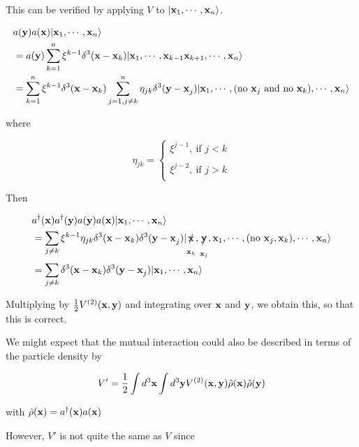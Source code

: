 This can be verified by applying $V$ to $|{\bf x}_1,\cdots,{\bf x}_n\rangle$. 

\[\begin{split}
&a({\bf y})a({\bf x})|{\bf x}_1,\cdots,{\bf x}_n\rangle\\
&=a({\bf y})\sum_{k=1}^n\xi^{k-1}\delta^3({\bf x - x}_k)|{\bf x}_1,\cdots,{\bf x}_{k-1}{\bf x}_{k+1},\cdots,{\bf x}_n\rangle\\
&=\sum_{k=1}^n\xi^{k-1}\delta^3({\bf x-x}_k)\sum_{j=1,j\neq k}^n\eta_{jk}\delta^3({\bf y-x}_j)|{\bf x}_1,\cdots,(\text{no }{\bf x}_j\text{ and no }{\bf x}_k),\cdots,{\bf x}_n\rangle
\end{split}\]

where

\[\eta_{jk}=\begin{cases}
\xi^{j-1},\ \text{if }j<k\\
\ \\
\xi^{j-2},\ \text{if }j>k\\
\end{cases} \]

Then

\begin{align}
\begin{split}
&a^\dagger({\bf x})a^\dagger({\bf y})a({\bf y})a({\bf x})|{\bf x}_1,\cdots,{\bf x}_n\rangle\\
&=\sum_{j\neq k}\xi^{k-1}\eta_{jk}\delta^3({\bf x - x}_k)\delta^3({\bf y - x}_j)|\underset{{\bf x}_k}{\xout{\bf x}},\underset{{\bf x}_j}{\xout{\bf y}},{\bf x}_1,\cdots,(\text{no }{\bf x}_j,{\bf x}_k),\cdots,{\bf x}_n\rangle\\
&=\sum_{j\neq k}\delta^3({\bf x-x}_k)\delta^3({\bf y - x}_j)|{\bf x}_1,\cdots,{\bf x}_n\rangle
\end{split}
\end{align}

Multiplying by $\frac{1}{2}V^{(2)}(\bf x,y)$ and integrating over $\bf x$ and $\bf y$, we obtain this, so that this is correct. 

We might expect that the mutual interaction could also be described in terms of the particle density by

\begin{align}
V'=\frac{1}{2}\int d^3{\bf x}\int d^3{\bf y}V^{(2)}({\bf x,y})\hat{\rho}({\bf x})\hat{\rho}(\bf y)
\end{align}

with $\hat{\rho}({\bf x}) = a^\dagger({\bf x})a(\bf x)$

However, $V'$ is not quite the same as $V$ since 

